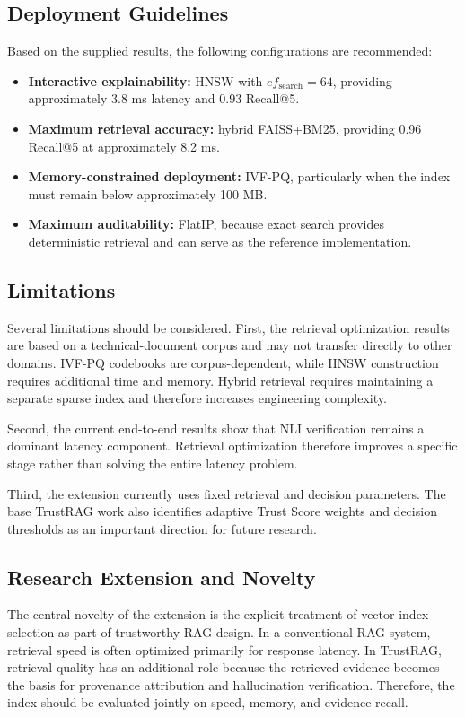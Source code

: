 \documentclass[conference]{IEEEtran}
\begin{document}
\subsection{Deployment Guidelines}

Based on the supplied results, the following configurations are recommended:
\begin{itemize}
    \item \textbf{Interactive explainability:} HNSW with $ef_{\mathrm{search}}=64$, providing approximately 3.8 ms latency and 0.93 Recall@5.
    \item \textbf{Maximum retrieval accuracy:} hybrid FAISS+BM25, providing 0.96 Recall@5 at approximately 8.2 ms.
    \item \textbf{Memory-constrained deployment:} IVF-PQ, particularly when the index must remain below approximately 100 MB.
    \item \textbf{Maximum auditability:} FlatIP, because exact search provides deterministic retrieval and can serve as the reference implementation.
\end{itemize}

\subsection{Limitations}

Several limitations should be considered. First, the retrieval optimization results are based on a technical-document corpus and may not transfer directly to other domains. IVF-PQ codebooks are corpus-dependent, while HNSW construction requires additional time and memory. Hybrid retrieval requires maintaining a separate sparse index and therefore increases engineering complexity.

Second, the current end-to-end results show that NLI verification remains a dominant latency component. Retrieval optimization therefore improves a specific stage rather than solving the entire latency problem.

Third, the extension currently uses fixed retrieval and decision parameters. The base TrustRAG work also identifies adaptive Trust Score weights and decision thresholds as an important direction for future research.

\subsection{Research Extension and Novelty}

The central novelty of the extension is the explicit treatment of vector-index selection as part of trustworthy RAG design. In a conventional RAG system, retrieval speed is often optimized primarily for response latency. In TrustRAG, retrieval quality has an additional role because the retrieved evidence becomes the basis for provenance attribution and hallucination verification. Therefore, the index should be evaluated jointly on speed, memory, and evidence recall.
\end{document}
